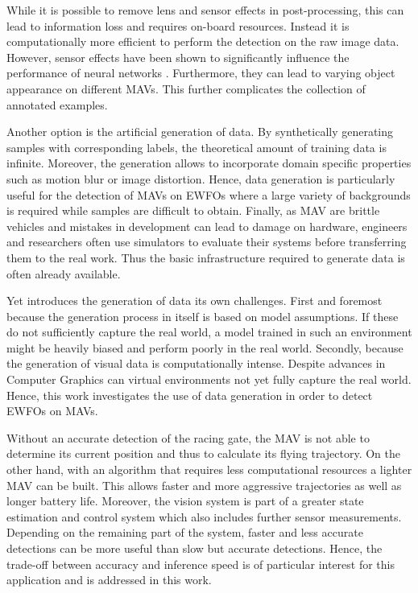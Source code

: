 While it is possible to remove lens and sensor effects in post-processing, this can lead to information loss and requires on-board resources. Instead it is computationally more efficient to perform the detection on the raw image data. However, sensor effects have been shown to significantly influence the performance of neural networks \cite{Andreopoulos2012,Dodge2016a}. Furthermore, they can lead to varying object appearance on different \acp{MAV}. This further complicates the collection of annotated examples.
 
Another option is the artificial generation of data. By synthetically generating samples with corresponding labels, the theoretical amount of training data is infinite. Moreover, the generation allows to incorporate domain specific properties such as motion blur or image distortion. Hence, data generation is particularly useful for the detection of \acp{MAV} on \acp{EWFO} where a large variety of backgrounds is required while samples are difficult to obtain. Finally, as \ac{MAV} are brittle vehicles and mistakes in development can lead to damage on hardware, engineers and researchers often use simulators to evaluate their systems before transferring them to the real work. Thus the basic infrastructure required to generate data is often already available. 

Yet introduces the generation of data its own challenges. First and foremost because the generation process in itself is based on model assumptions. If these do not sufficiently capture the real world, a model trained in such an environment might be heavily biased and perform poorly in the real world. Secondly, because the generation of visual data is computationally intense. Despite advances in Computer Graphics can virtual environments not yet fully capture the real world. Hence, this work investigates the use of data generation in order to detect \acp{EWFO} on \acp{MAV}.

Without an accurate detection of the racing gate, the \ac{MAV} is not able to determine its current position and thus to calculate its flying trajectory. On the other hand, with an algorithm that requires less computational resources a lighter \ac{MAV} can be built. This allows faster and more aggressive trajectories as well as longer battery life. Moreover, the vision system is part of a greater state estimation and control system which also includes further sensor measurements. Depending on the remaining part of the system, faster and less accurate detections can be more useful than slow but accurate detections. Hence, the trade-off between accuracy and inference speed is of particular interest for this application and is addressed in this work.

